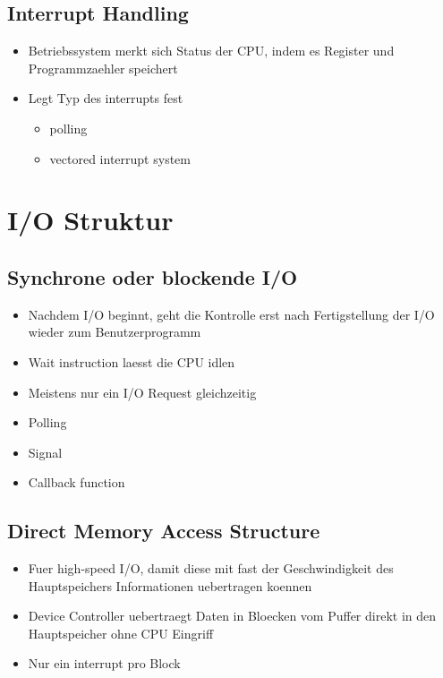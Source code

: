 \documentclass[a4paper]{scrreprt}
\begin{document}
\subsection{Interrupt Handling}
\begin{itemize}
	\item Betriebssystem merkt sich Status der CPU, indem es Register und Programmzaehler speichert
	\item Legt Typ des interrupts fest
		\begin{itemize}
			\item polling
			\item vectored interrupt system
		\end{itemize}
\end{itemize}

\section{I/O Struktur}
\subsection{Synchrone oder blockende I/O}
\begin{itemize}
	\item Nachdem I/O beginnt, geht die Kontrolle erst nach Fertigstellung der I/O wieder zum Benutzerprogramm
	\item Wait instruction laesst die CPU idlen
	\item Meistens nur ein I/O Request gleichzeitig
	\item Polling
	\item Signal
	\item Callback function
\end{itemize}

\subsection{Direct Memory Access Structure}
\begin{itemize}
	\item Fuer high-speed I/O, damit diese mit fast der Geschwindigkeit des Hauptspeichers Informationen uebertragen koennen
	\item Device Controller uebertraegt Daten in Bloecken vom Puffer direkt in den Hauptspeicher ohne CPU Eingriff
	\item Nur ein interrupt pro Block
\end{itemize}
\end{document}
